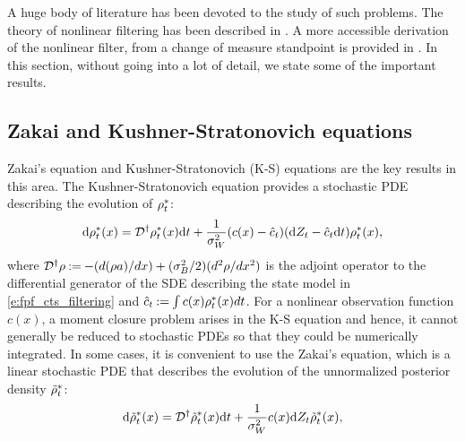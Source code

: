 A huge body of literature has been devoted to the study of such problems. 
The theory of nonlinear filtering has been described in \cite{kal80, baicri08}. A more accessible derivation of the nonlinear filter, from a change of measure standpoint is provided in \cite{kutsurpfi19}. In this section, without going into a lot of detail, we state some of the important results.
\subsection{Zakai and Kushner-Stratonovich equations}
Zakai's equation \cite{zak69} and Kushner-Stratonovich (K-S) \cite{kus67, str60} equations are the key results in this area. 
The Kushner-Stratonovich equation provides a stochastic PDE describing the evolution of $\rho^*_t$:
\begin{equation}
\ud \pr^*_t(x) = \generate^\dagger \pr^*_t(x) \ud t + \frac{1}{\sigma^2_W} (c(x) - \hat{c}_t) (\ud Z_t - \hat{c}_t\ud t) \pr^*_t(x),
\label{e:fpf_kushner_stratonovich}
\end{equation}
where ${\cal D}^\dagger \rho \mathbin{:=} - (d(\rho a) / dx) + (\sigma^2_B/2) (d^2 \rho /d x^2)$ is the adjoint operator to the differential generator of the SDE describing the state model in \eqref{e:fpf_cts_filtering} and ${\hat c}_t \mathbin{:=} \int c(x) \rho^*_t(x) dt$. 
For a nonlinear observation function $c(x)$, a moment closure problem arises in the K-S equation and hence, it cannot generally be reduced to stochastic PDEs so that they could be numerically integrated. In some cases, it is convenient to use the Zakai's equation, which is a linear stochastic PDE that describes the evolution of the unnormalized posterior density $\tilde{\rho}^*_t$: 
\begin{equation}
\ud \tilde{\pr}^*_t(x) = \generate^\dagger \tilde{\pr}^*_t(x) \ud t + \frac{1}{\sigma^2_W}  c(x) \ud Z_t \tilde{\pr}^*_t(x), 
\label{e:fpf_zakai}
\end{equation}

